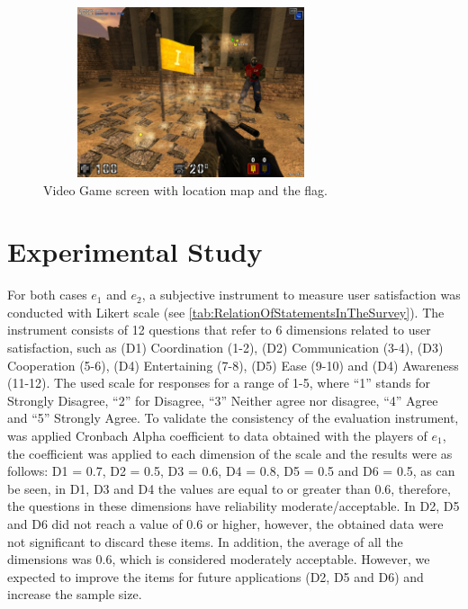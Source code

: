\documentclass{./sty/llncs}
\begin{document}
\begin{figure}[ht!]
	\centering
			\includegraphics[width=8.7cm,height=5cm]{images/juego.jpg}
	\caption{Video Game screen with location map and the flag.}
	\label{fig:juego}
\end{figure}


\section{Experimental Study} 
\label{sec:study}

For both cases $e_1$ and $e_2$, a subjective instrument to measure user satisfaction was conducted with Likert scale (see \ref{tab:RelationOfStatementsInTheSurvey}). The instrument consists of 12 questions that refer to 6 dimensions related to user satisfaction, such as (D1) Coordination (1-2), (D2) Communication (3-4), (D3) Cooperation (5-6), (D4) Entertaining (7-8), (D5) Ease (9-10) and (D4) Awareness (11-12). The used scale for responses for a range of 1-5, where ``1'' stands for Strongly Disagree, ``2'' for Disagree, ``3'' Neither agree nor disagree, ``4'' Agree and ``5'' Strongly Agree. To validate the consistency of the evaluation instrument, was applied Cronbach Alpha coefficient to data obtained with the players of $e_1$, the coefficient was applied to each dimension of the scale and the results were as follows: D1 = 0.7, D2 = 0.5, D3 = 0.6, D4 = 0.8, D5 = 0.5 and D6 = 0.5, as can be seen, in D1, D3 and D4 the values are equal to or greater than 0.6, therefore, the questions in these dimensions have reliability moderate/acceptable. In D2, D5 and D6 did not reach a value of 0.6 or higher, however, the obtained data were not significant to discard these items. In addition, the average of all the dimensions was 0.6, which is considered moderately acceptable. However, we expected to improve the items for future applications (D2, D5 and D6) and increase the sample size.
\end{document}
